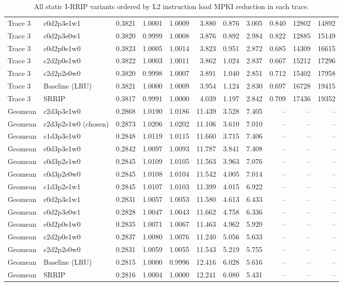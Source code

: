 \begin{table}[H]
{\begin{tabular}{llrrrrrrrrr}
Trace 3 & c0d2p3e1w1 & 0.3821 & 1.0001 & 1.0009 & 3.880 & 0.876 & 3.005 & 0.840 & 12802 & 14892 \\
Trace 3 & c0d2p3e0w1 & 0.3820 & 0.9999 & 1.0008 & 3.876 & 0.892 & 2.984 & 0.822 & 12885 & 15149 \\
Trace 3 & c0d2p0e1w0 & 0.3823 & 1.0005 & 1.0014 & 3.823 & 0.951 & 2.872 & 0.685 & 14309 & 16615 \\
Trace 3 & c2d2p0e1w0 & 0.3822 & 1.0003 & 1.0011 & 3.862 & 1.024 & 2.837 & 0.667 & 15212 & 17296 \\
Trace 3 & c2d2p2e0w0 & 0.3820 & 0.9998 & 1.0007 & 3.891 & 1.040 & 2.851 & 0.712 & 15402 & 17958 \\
Trace 3 & Baseline (LRU) & 0.3821 & 1.0000 & 1.0009 & 3.954 & 1.124 & 2.830 & 0.697 & 16728 & 19415 \\
Trace 3 & SRRIP & 0.3817 & 0.9991 & 1.0000 & 4.039 & 1.197 & 2.842 & 0.709 & 17436 & 19352 \\
\midrule
Geomean & c2d3p3e1w0 & 0.2868 & 1.0190 & 1.0186 & 11.439 & 3.528 & 7.405 & -- & -- & -- \\
Geomean & c2d3p2e1w0 (chosen) & 0.2873 & 1.0206 & 1.0202 & 11.106 & 3.610 & 7.010 & -- & -- & -- \\
Geomean & c1d3p3e1w0 & 0.2848 & 1.0119 & 1.0115 & 11.660 & 3.715 & 7.406 & -- & -- & -- \\
Geomean & c0d3p3e1w0 & 0.2842 & 1.0097 & 1.0093 & 11.787 & 3.841 & 7.408 & -- & -- & -- \\
Geomean & c0d3p2e1w0 & 0.2845 & 1.0109 & 1.0105 & 11.563 & 3.963 & 7.076 & -- & -- & -- \\
Geomean & c0d3p2e0w0 & 0.2845 & 1.0108 & 1.0104 & 11.542 & 4.005 & 7.014 & -- & -- & -- \\
Geomean & c1d3p2e1w1 & 0.2845 & 1.0107 & 1.0103 & 11.399 & 4.015 & 6.922 & -- & -- & -- \\
Geomean & c0d2p3e1w1 & 0.2831 & 1.0057 & 1.0053 & 11.580 & 4.613 & 6.433 & -- & -- & -- \\
Geomean & c0d2p3e0w1 & 0.2828 & 1.0047 & 1.0043 & 11.662 & 4.758 & 6.336 & -- & -- & -- \\
Geomean & c0d2p0e1w0 & 0.2835 & 1.0071 & 1.0067 & 11.463 & 4.962 & 5.920 & -- & -- & -- \\
Geomean & c2d2p0e1w0 & 0.2837 & 1.0080 & 1.0076 & 11.240 & 5.056 & 5.633 & -- & -- & -- \\
Geomean & c2d2p2e0w0 & 0.2831 & 1.0059 & 1.0055 & 11.543 & 5.219 & 5.755 & -- & -- & -- \\
Geomean & Baseline (LRU) & 0.2815 & 1.0000 & 0.9996 & 12.416 & 6.028 & 5.616 & -- & -- & -- \\
Geomean & SRRIP & 0.2816 & 1.0004 & 1.0000 & 12.241 & 6.080 & 5.431 & -- & -- & -- \\
\bottomrule
\end{tabular}}
\ifdim\wd\fitbx>\linewidth\resizebox{\linewidth}{!}{\usebox{\fitbx}}\else\usebox{\fitbx}\fi
\caption{All static I-RRIP variants ordered by L2 instruction load MPKI reduction in each trace.}\label{tab:t2a_all_tests}
\end{table}
